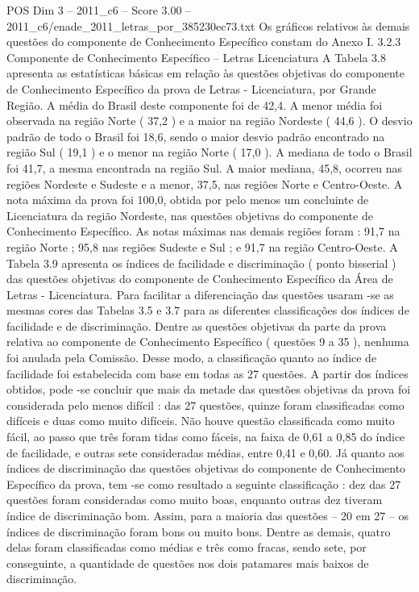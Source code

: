 \begin{textsample}{POS Dim 3 – 2011\_c6 – Score 3.00 – 2011\_c6/enade\_2011\_letras\_por\_385230ec73.txt}
Os gráficos relativos às demais questões do componente de Conhecimento Específico constam do Anexo I. 3.2.3 Componente de Conhecimento Específico – Letras Licenciatura A Tabela 3.8 apresenta as estatísticas básicas em relação às questões objetivas do componente de Conhecimento Específico da prova de Letras - Licenciatura, por Grande Região.
A média do Brasil deste componente foi de 42,4.
A menor média foi observada na região Norte ( 37,2 ) e a maior na região Nordeste ( 44,6 ).
O desvio padrão de todo o Brasil foi 18,6, sendo o maior desvio padrão encontrado na região Sul ( 19,1 ) e o menor na região Norte ( 17,0 ).
A mediana de todo o Brasil foi 41,7, a mesma encontrada na região Sul.
A maior mediana, 45,8, ocorreu nas regiões Nordeste e Sudeste e a menor, 37,5, nas regiões Norte e Centro-Oeste.
A nota máxima da prova foi 100,0, obtida por pelo menos um concluinte de Licenciatura da região Nordeste, nas questões objetivas do componente de Conhecimento Específico.
As notas máximas nas demais regiões foram : 91,7 na região Norte ; 95,8 nas regiões Sudeste e Sul ; e 91,7 na região Centro-Oeste.
A Tabela 3.9 apresenta os índices de facilidade e discriminação ( ponto bisserial ) das questões objetivas do componente de Conhecimento Específico da Área de Letras - Licenciatura.
Para facilitar a diferenciação das questões usaram -se as mesmas cores das Tabelas 3.5 e 3.7 para as diferentes classificações dos índices de facilidade e de discriminação.
Dentre as questões objetivas da parte da prova relativa ao componente de Conhecimento Específico ( questões 9 a 35 ), nenhuma foi anulada pela Comissão.
Desse modo, a classificação quanto ao índice de facilidade foi estabelecida com base em todas as 27 questões.
A partir dos índices obtidos, pode -se concluir que mais da metade das questões objetivas da prova foi considerada pelo menos difícil : das 27 questões, quinze foram classificadas como difíceis e duas como muito difíceis.
Não houve questão classificada como muito fácil, ao passo que três foram tidas como fáceis, na faixa de 0,61 a 0,85 do índice de facilidade, e outras sete consideradas médias, entre 0,41 e 0,60.
Já quanto aos índices de discriminação das questões objetivas do componente de Conhecimento Específico da prova, tem -se como resultado a seguinte classificação : dez das 27 questões foram consideradas como muito boas, enquanto outras dez tiveram índice de discriminação bom.
Assim, para a maioria das questões – 20 em 27 – os índices de discriminação foram bons ou muito bons.
Dentre as demais, quatro delas foram classificadas como médias e três como fracas, sendo sete, por conseguinte, a quantidade de questões nos dois patamares mais baixos de discriminação.

\end{textsample}
